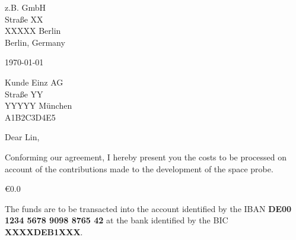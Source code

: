 \documentclass[11pt]{article}
\begin{document}
  \hspace*{0.5\linewidth}
  \begin{minipage}{0.4\linewidth}
  z.B. GmbH \\
  Stra{\ss}e XX \\
  XXXXX Berlin \\
  Berlin, Germany
  \par\bigskip
  \today
  \end{minipage}

  Kunde Einz AG \\
  Stra{\ss}e YY \\
  YYYYY M\"unchen \\
  A1B2C3D4E5
  \par\bigskip

  Dear Lin,
  \par\bigskip

  Conforming our agreement, I hereby present you the costs to be processed on
  account of the contributions made to the development of the space probe.

\begin{invoice}{\euro}{0.0} %

\end{invoice}

  The funds are to be transacted into the account identified by the
  IBAN \textbf{DE00 1234 5678 9098 8765 42} at the bank identified by the BIC
  \textbf{XXXXDEB1XXX}.

\end{document}
